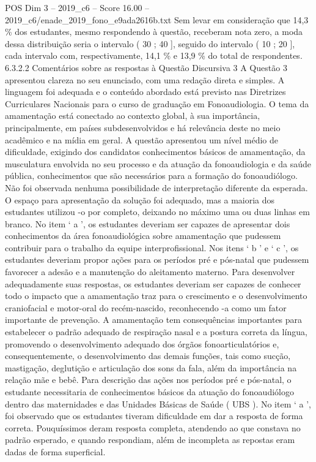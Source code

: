 \begin{textsample}{POS Dim 3 – 2019\_c6 – Score 16.00 – 2019\_c6/enade\_2019\_fono\_e9ada2616b.txt}
Sem levar em consideração que 14,3 \% dos estudantes, mesmo respondendo à questão, receberam nota zero, a moda dessa distribuição seria o intervalo ( 30 ; 40 ], seguido do intervalo ( 10 ; 20 ], cada intervalo com, respectivamente, 14,1 \% e 13,9 \% do total de respondentes. 6.3.2.2 Comentários sobre as respostas à Questão Discursiva 3 A Questão 3 apresentou clareza no seu enunciado, com uma redação direta e simples.
A linguagem foi adequada e o conteúdo abordado está previsto nas Diretrizes Curriculares Nacionais para o curso de graduação em Fonoaudiologia.
O tema da amamentação está conectado ao contexto global, à sua importância, principalmente, em países subdesenvolvidos e há relevância deste no meio acadêmico e na mídia em geral.
A questão apresentou um nível médio de dificuldade, exigindo dos candidatos conhecimentos básicos de amamentação, da musculatura envolvida no seu processo e da atuação da fonoaudiologia e da saúde pública, conhecimentos que são necessários para a formação do fonoaudiólogo.
Não foi observada nenhuma possibilidade de interpretação diferente da esperada.
O espaço para apresentação da solução foi adequado, mas a maioria dos estudantes utilizou -o por completo, deixando no máximo uma ou duas linhas em branco.
No item ‘ a ’, os estudantes deveriam ser capazes de apresentar dois conhecimentos da área fonoaudiológica sobre amamentação que pudessem contribuir para o trabalho da equipe interprofissional.
Nos itens ‘ b ’ e ‘ c ’, os estudantes deveriam propor ações para os períodos pré e pós-natal que pudessem favorecer a adesão e a manutenção do aleitamento materno.
Para desenvolver adequadamente suas respostas, os estudantes deveriam ser capazes de conhecer todo o impacto que a amamentação traz para o crescimento e o desenvolvimento craniofacial e motor-oral do recém-nascido, reconhecendo -a como um fator importante de prevenção.
A amamentação tem consequências importantes para estabelecer o padrão adequado de respiração nasal e a postura correta da língua, promovendo o desenvolvimento adequado dos órgãos fonoarticulatórios e, consequentemente, o desenvolvimento das demais funções, tais como sucção, mastigação, deglutição e articulação dos sons da fala, além da importância na relação mãe e bebê.
Para descrição das ações nos períodos pré e pós-natal, o estudante necessitaria de conhecimentos básicos da atuação do fonoaudiólogo dentro das maternidades e das Unidades Básicas de Saúde ( UBS ).
No item ‘ a ’, foi observado que os estudantes tiveram dificuldade em dar a resposta de forma correta.
Pouquíssimos deram resposta completa, atendendo ao que constava no padrão esperado, e quando respondiam, além de incompleta as repostas eram dadas de forma superficial.

\end{textsample}
